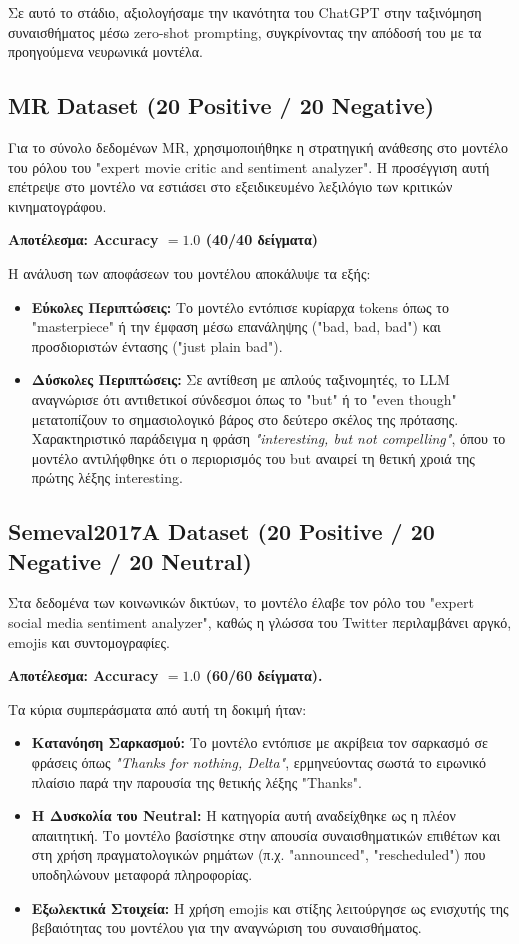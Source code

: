 \documentclass[12pt]{article}
\begin{document}
Σε αυτό το στάδιο, αξιολογήσαμε την ικανότητα του ChatGPT στην ταξινόμηση συναισθήματος μέσω zero-shot prompting, συγκρίνοντας την απόδοσή του με τα προηγούμενα νευρωνικά μοντέλα.

\subsection*{MR Dataset (20 Positive / 20 Negative)}

Για το σύνολο δεδομένων MR, χρησιμοποιήθηκε η στρατηγική ανάθεσης στο μοντέλο του ρόλου του "expert movie critic and sentiment analyzer". Η προσέγγιση αυτή επέτρεψε στο μοντέλο να εστιάσει στο εξειδικευμένο λεξιλόγιο των κριτικών κινηματογράφου.

\textbf{Αποτέλεσμα: Accuracy $= 1.0$ (40/40 δείγματα)}

Η ανάλυση των αποφάσεων του μοντέλου αποκάλυψε τα εξής:
\begin{itemize}
    \item \textbf{Εύκολες Περιπτώσεις:} Το μοντέλο εντόπισε κυρίαρχα tokens όπως το "masterpiece" ή την έμφαση μέσω επανάληψης ("bad, bad, bad") και προσδιοριστών έντασης ("just plain bad").
    \item \textbf{Δύσκολες Περιπτώσεις:} Σε αντίθεση με απλούς ταξινομητές, το LLM αναγνώρισε ότι αντιθετικοί σύνδεσμοι όπως το "but" ή το "even though" μετατοπίζουν το σημασιολογικό βάρος στο δεύτερο σκέλος της πρότασης. Χαρακτηριστικό παράδειγμα η φράση \textit{"interesting, but not compelling"}, όπου το μοντέλο αντιλήφθηκε ότι ο περιορισμός του but αναιρεί τη θετική χροιά της πρώτης λέξης interesting.
\end{itemize}

\subsection*{Semeval2017A Dataset (20 Positive / 20 Negative / 20 Neutral)}

Στα δεδομένα των κοινωνικών δικτύων, το μοντέλο έλαβε τον ρόλο του "expert social media sentiment analyzer", καθώς η γλώσσα του Twitter περιλαμβάνει αργκό, emojis και συντομογραφίες.

\textbf{Αποτέλεσμα: Accuracy $= 1.0$ (60/60 δείγματα).}

Τα κύρια συμπεράσματα από αυτή τη δοκιμή ήταν:
\begin{itemize}
    \item \textbf{Κατανόηση Σαρκασμού:} Το μοντέλο εντόπισε με ακρίβεια τον σαρκασμό σε φράσεις όπως \textit{"Thanks for nothing, Delta"}, ερμηνεύοντας σωστά το ειρωνικό πλαίσιο παρά την παρουσία της θετικής λέξης "Thanks".
    \item \textbf{Η Δυσκολία του Neutral:} Η κατηγορία αυτή αναδείχθηκε ως η πλέον απαιτητική. Το μοντέλο βασίστηκε στην απουσία συναισθηματικών επιθέτων και στη χρήση πραγματολογικών ρημάτων (π.χ. "announced", "rescheduled") που υποδηλώνουν μεταφορά πληροφορίας.
    \item \textbf{Εξωλεκτικά Στοιχεία:} Η χρήση emojis και στίξης λειτούργησε ως ενισχυτής της βεβαιότητας του μοντέλου για την αναγνώριση του συναισθήματος.
\end{itemize}
\end{document}

